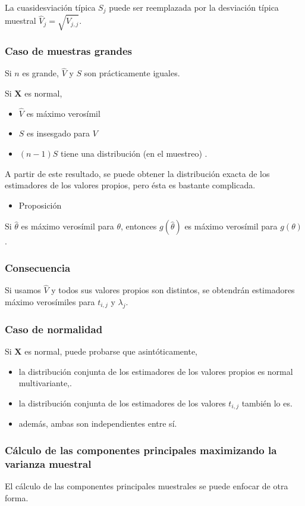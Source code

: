 La cuasidesviación típica $S_j$ puede ser reemplazada por la desviación típica muestral $\hat{V}_j=\sqrt{\hat{V}_{j,j}}$.
\subsubsection{Caso de muestras grandes}
Si $n$ es grande, $\hat{V}$ y $S$ son prácticamente iguales.

Si $\mathbf{X}$ es normal,
\begin{itemize}
	\item $\hat{V}$ es máximo verosímil
	\item $S$ es insesgado para $V$
	\item $(n-1)S$ tiene una distribución (en el muestreo)  .
\end{itemize}
A partir de este resultado, se puede obtener la distribución exacta de los estimadores de los valores propios, pero ésta es bastante complicada.
\begin{itemize}[label=\color{red}\textbullet, leftmargin=*]
	\item \color{lightblue}Proposición
\end{itemize}
Si $\hat{\theta}$ es máximo verosímil para $\theta$, entonces $g(\hat{\theta})$ es máximo verosímil para $g(\theta)$.
\subsubsection{Consecuencia}Si usamos $\hat{V}$ y todos sus valores propios son distintos, se obtendrán estimadores máximo verosímiles para $t_{i,j}$ y $\lambda_j$.
\subsubsection{Caso de normalidad}
Si $\mathbf{X}$ es normal, puede probarse que asintóticamente,
\begin{itemize}
	\item la distribución conjunta de los estimadores de los valores propios es normal multivariante,.
	\item la distribución conjunta de los estimadores de los valores $t_{i,j}$ también lo es.
	\item además, ambas son independientes entre sí.
\end{itemize}
\subsubsection{Cálculo de las componentes principales maximizando la varianza muestral}
El cálculo de las componentes principales muestrales se puede enfocar de otra forma.

